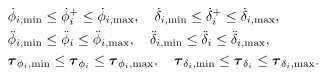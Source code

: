 \documentclass[10pt]{article}
\newcommand{\wheelAngle}{\phi}
\begin{document}
\begin{equation}
\begin{aligned}
      &\dot{\wheelAngle}_{i,\text{min}}
        \leq\dot{\wheelAngle}_i^{+}
        \leq\dot{\wheelAngle}_{i,\text{max}},
        \quad
        \dot\delta_{i,\text{min}}
        \leq\dot\delta_i^{+}
        \leq\dot\delta_{i,\text{max}},\\
      &\ddot{\wheelAngle}_{i,\text{min}}
        \leq\ddot{\wheelAngle}_i
        \leq\ddot{\wheelAngle}_{i,\text{max}},
        \quad
        \ddot{\delta}_{i,\text{min}}
        \leq\ddot\delta_i
        \leq\ddot{\delta}_{i,\text{max}},\\
      &\jtorques_{\wheelAngle_i,\text{min}}
        \leq\jtorques_{\wheelAngle_i}
        \leq\jtorques_{\wheelAngle_i,\text{max}},
        \quad
        \jtorques_{\delta_i,\text{min}}
        \leq\jtorques_{\delta_i}
        \leq\jtorques_{\delta_i,\text{max}}.
  \end{aligned}
\end{equation}
\end{document}
